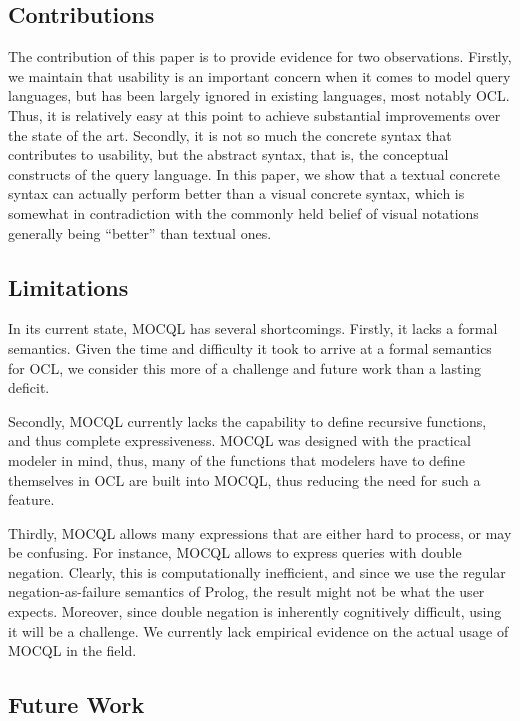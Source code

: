 \documentclass{llncs}
\newcommand{\MMQ}{MOCQL\xspace}
\begin{document}
\subsection{Contributions}

The contribution of this paper is to provide evidence for two observations. Firstly, we maintain that usability is an important concern when it comes to model query languages, but has been largely ignored in existing languages, most notably OCL. Thus, it is relatively easy at this point to achieve substantial improvements over the state of the art. Secondly, it is not so much the concrete syntax that contributes to usability, but the abstract syntax, that is, the conceptual constructs of the query language. In this paper, we show that a textual concrete syntax can actually perform better than a visual concrete syntax, which is somewhat in contradiction with the commonly held belief of visual notations generally being ``better'' than textual ones. 


\subsection{Limitations}

In its current state, \MMQ has several shortcomings. Firstly, it lacks a formal semantics. Given the time and difficulty it took to arrive at a formal semantics for OCL, we consider this more of a challenge and future work than a lasting deficit. 

Secondly, \MMQ currently lacks the capability to define recursive functions, and thus complete expressiveness. \MMQ was designed with the practical modeler in mind, thus, many of the functions that modelers have to define themselves in OCL are built into \MMQ, thus reducing the need for such a feature. 

Thirdly, \MMQ allows many expressions that are either hard to process, or may be confusing. For instance, \MMQ allows to express queries with double negation. Clearly, this is computationally inefficient, and since we use the regular negation-as-failure semantics of Prolog, the result might not be what the user expects. Moreover, since double negation is inherently cognitively difficult, using it will be a challenge. We currently lack empirical evidence on the actual usage of \MMQ in the field.


\subsection{Future Work}
\end{document}
